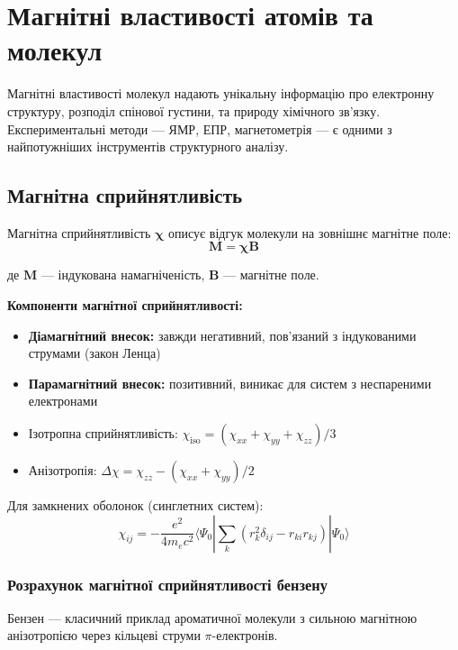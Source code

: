 \section{Магнітні властивості атомів та молекул}\label{sec:magprop}

Магнітні властивості молекул надають унікальну інформацію про електронну
структуру, розподіл спінової густини, та природу хімічного зв'язку.
Експериментальні методи --- ЯМР, ЕПР, магнетометрія --- є одними з
найпотужніших інструментів структурного аналізу.

\subsection{Магнітна сприйнятливість}

Магнітна сприйнятливість $\boldsymbol{\chi}$ описує відгук молекули
на зовнішнє магнітне поле:
\[
\mathbf{M} = \boldsymbol{\chi} \mathbf{B}
\]

де $\mathbf{M}$ --- індукована намагніченість, $\mathbf{B}$ --- магнітне поле.

\textbf{Компоненти магнітної сприйнятливості:}
\begin{itemize}
    \item \textbf{Діамагнітний внесок:} завжди негативний, пов'язаний
          з індукованими струмами (закон Ленца)
    \item \textbf{Парамагнітний внесок:} позитивний, виникає для систем
          з неспареними електронами
    \item Ізотропна сприйнятливість: $\chi_{\text{iso}} = (\chi_{xx} + \chi_{yy} + \chi_{zz})/3$
    \item Анізотропія: $\Delta\chi = \chi_{zz} - (\chi_{xx} + \chi_{yy})/2$
\end{itemize}

Для замкнених оболонок (синглетних систем):
\[
\chi_{ij} = -\frac{e^2}{4m_e c^2} \langle\Psi_0|
\sum_k (r_k^2 \delta_{ij} - r_{ki} r_{kj})|\Psi_0\rangle
\]

\subsubsection{Розрахунок магнітної сприйнятливості бензену}

Бензен --- класичний приклад ароматичної молекули з сильною
магнітною анізотропією через кільцеві струми $\pi$-електронів.

